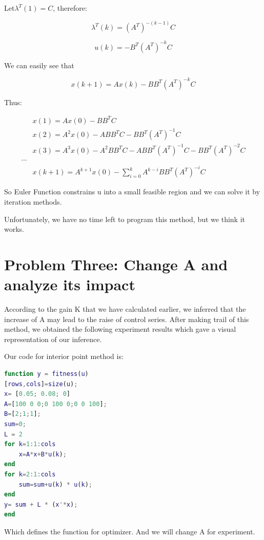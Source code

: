 \documentclass{mcmthesis}
\begin{document}
Let$\lambda^T(1)=C$, therefore:

 $$\lambda^T(k)=(A^T)^{-(k-1)}C$$

$$u(k)=-B^T(A^T)^{-k}C$$

We can easily see that

$$x(k+1)=Ax(k)-BB^T(A^T)^{-k}C$$

Thus:

\begin{align}
&x(1)=A x(0)-B B^{T} C \\
&x(2)=A^{2} x(0)-A B B^{T} C-B B^{T}\left(A^{T}\right)^{-1} C \\
&x(3)=A^{3} x(0)-A^{2} B B^{T} C-A B B^{T}\left(A^{T}\right)^{-1} C-B B^{T}\left(A^{T}\right)^{-2} C \\
\cdots \\
& x(k+1)=A^{k+1} x(0)-\sum_{i=0}^{k} A^{k-i} B B^{T}\left(A^{T}\right)^{-i} C
\end{align}

So Euler Function constrains u into a small  feasible region and we can solve it by iteration methods.

Unfortunately, we have no time left to program this method, but we think it works.


\section{Problem Three: Change A and analyze its impact}
According to the gain K that we have calculated earlier, we inferred that the increase of A may lead to the raise of control series. After making trail of this method, we obtained the following experiment results which gave a visual representation of our inference.\cite{MatthewGSmith:2005:GPEM}\cite{conf/smc/NetoFR13}

Our code for interior point method is:

\begin{lstlisting}[language=MATLAB, caption=Function for interior point method]
function y = fitness(u)
[rows,cols]=size(u);
x= [0.05; 0.08; 0]
A=[100 0 0;0 100 0;0 0 100];
B=[2;1;1];
sum=0;
L = 2
for k=1:1:cols
    x=A*x+B*u(k);
end
for k=2:1:cols
    sum=sum+u(k) * u(k);
end
y= sum + L * (x'*x);
end
\end{lstlisting}

Which defines the function for optimizer. And we will change A for experiment.
\end{document}
